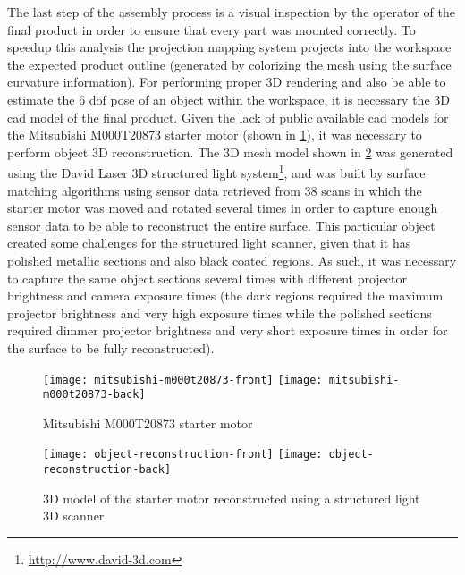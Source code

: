 The last step of the assembly process is a visual inspection by the operator of the final product in order to ensure that every part was mounted correctly. To speedup this analysis the projection mapping system projects into the workspace the expected product outline (generated by colorizing the mesh using the surface curvature information). For performing proper 3D rendering and also be able to estimate the 6 \gls{dof} pose of an object within the workspace, it is necessary the 3D \gls{cad} model of the final product. Given the lack of public available \gls{cad} models for the Mitsubishi M000T20873 starter motor (shown in \cref{fig:starter-motor}), it was necessary to perform object 3D reconstruction. The 3D mesh model shown in \cref{fig:object-reconstruction} was generated using the David Laser 3D structured light system\footnote{\url{http://www.david-3d.com}}, and was built by surface matching algorithms using sensor data retrieved from 38 scans in which the starter motor was moved and rotated several times in order to capture enough sensor data to be able to reconstruct the entire surface. This particular object created some challenges for the structured light scanner, given that it has polished metallic sections and also black coated regions. As such, it was necessary to capture the same object sections several times with different projector brightness and camera exposure times (the dark regions required the maximum projector brightness and very high exposure times while the polished sections required dimmer projector brightness and very short exposure times in order for the surface to be fully reconstructed).

\begin{figure}[!ht]
	\centering
	\texttt{[image: mitsubishi-m000t20873-front]}
	\texttt{[image: mitsubishi-m000t20873-back]}
	\caption{Mitsubishi M000T20873 starter motor}
	\label{fig:starter-motor}
\end{figure}

\begin{figure}[!ht]
	\centering
	\texttt{[image: object-reconstruction-front]}
	\texttt{[image: object-reconstruction-back]}
	\caption{3D model of the starter motor reconstructed using a structured light 3D scanner}
	\label{fig:object-reconstruction}
\end{figure}




